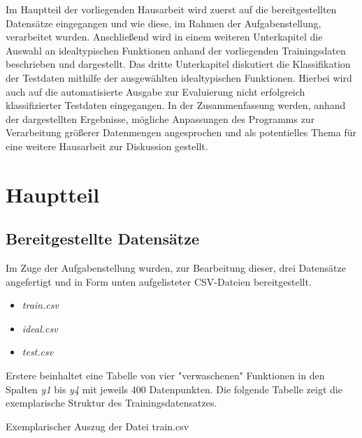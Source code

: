 Im Hauptteil der vorliegenden Hausarbeit wird zuerst auf die bereitgestellten Datensätze eingegangen und wie diese, im Rahmen der Aufgabenstellung, verarbeitet wurden.
Anschließend wird in einem weiteren Unterkapitel die Auswahl an idealtypischen Funktionen anhand der vorliegenden Trainingsdaten beschrieben und dargestellt.
Das dritte Unterkapitel diskutiert die Klassifikation der Testdaten mithilfe der ausgewählten idealtypischen Funktionen. Hierbei wird auch auf die automatisierte Ausgabe zur Evaluierung nicht erfolgreich klassifizierter Testdaten eingegangen.
In der Zusammenfassung werden, anhand der dargestellten Ergebnisse, mögliche Anpassungen des Programms zur Verarbeitung größerer Datenmengen angesprochen und als potentielles Thema für eine weitere Hausarbeit zur Diskussion gestellt.

\chapter{Hauptteil}

\section{Bereitgestellte Datensätze}

Im Zuge der Aufgabenstellung wurden, zur Bearbeitung dieser, drei Datensätze angefertigt und in Form unten aufgelisteter CSV-Dateien bereitgestellt.

\begin{itemize}
 \itemsep0pt
 \item \emph{train.csv}
 \item \emph{ideal.csv}
 \item \emph{test.csv}
\end{itemize}

Erstere beinhaltet eine Tabelle von vier "verwaschenen" Funktionen in den Spalten \emph{y1} bis \emph{y4} mit jeweils 400 Datenpunkten. Die folgende Tabelle zeigt die exemplarische Struktur des Trainingsdatensatzes.

\begin{table}[H]
\small
\centering
{}
\caption{Exemplarischer Auszug der Datei train.csv}
\label{tab:Exemplarischer Auszug aus train.csv}
\end{table} 


